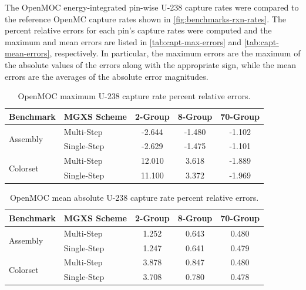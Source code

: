 The OpenMOC energy-integrated pin-wise U-238 capture rates were compared to the reference OpenMC capture rates shown in \autoref{fig:benchmarks-rxn-rates}. The percent relative errors for each pin's capture rates were computed and the maximum and mean errors are listed in \autoref{tab:capt-max-errors} and \autoref{tab:capt-mean-errors}, respectively. In particular, the maximum errors are the maximum of the absolute values of the errors along with the appropriate sign, while the mean errors are the averages of the absolute error magnitudes.

\begin{table}[h!]
  \centering
  \caption{OpenMOC maximum U-238 capture rate percent relative errors.}
  \label{tab:capt-max-errors}
  \begin{tabular}{l l c c c}
  \toprule
  \textbf{Benchmark} & \textbf{MGXS Scheme} & \textbf{2-Group} & \textbf{8-Group} & \textbf{70-Group} \\
  \midrule
  \multirow{2}{*}{Assembly} & Multi-Step    & -2.644 & -1.480 & -1.102 \\
                            & Single-Step & -2.629 & -1.475 & -1.101 \\
  \midrule
  \multirow{2}{*}{Colorset} & Multi-Step    & 12.010 & 3.618 & -1.889 \\
                            & Single-Step & 11.100 & 3.372 & -1.969 \\
  \bottomrule
\end{tabular}
\end{table}

\begin{table}[h!]
  \centering
  \caption{OpenMOC mean absolute U-238 capture rate percent relative errors.}
  \label{tab:capt-mean-errors}
  \begin{tabular}{l l c c c}
  \toprule
  \textbf{Benchmark} & \textbf{MGXS Scheme} & \textbf{2-Group} & \textbf{8-Group} & \textbf{70-Group} \\
  \midrule
  \multirow{2}{*}{Assembly} & Multi-Step    & 1.252 & 0.643 & 0.480 \\
                            & Single-Step & 1.247 & 0.641 & 0.479 \\
  \midrule
  \multirow{2}{*}{Colorset} & Multi-Step    & 3.878 & 0.847 & 0.480 \\
                            & Single-Step & 3.708 & 0.780 & 0.478 \\
  \bottomrule
\end{tabular}
\end{table}

